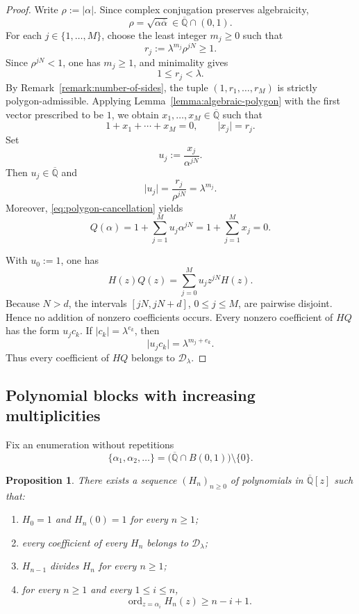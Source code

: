 \documentclass[10pt,a4paper]{amsart}
\newtheorem{proposition}[theorem]{Proposition}
\numberwithin{equation}{section}
\newcommand{\Qbar}{\overline{\mathbb Q}}
\newcommand{\D}{\mathcal D}
\newcommand{\abs}[1]{\lvert #1\rvert}
\newcommand{\ord}{\operatorname{ord}}
\newcommand{\B}{B(0,1)}
\begin{document}
\begin{proof}
Write $\rho:=\abs\alpha$. Since complex conjugation preserves algebraicity,
\[
        \rho=\sqrt{\alpha\overline\alpha}\in\Qbar\cap(0,1).
\]
For each $j\in\{1,\ldots,M\}$, choose the least integer $m_j\geq0$ such that
\[
        r_j:=\lambda^{m_j}\rho^{jN}\geq1.
\]
Since $\rho^{jN}<1$, one has $m_j\geq1$, and minimality gives
\begin{equation}\label{eq:normalized-lengths}
        1\leq r_j<\lambda.
\end{equation}
By Remark~\ref{remark:number-of-sides}, the tuple
$(1,r_1,\ldots,r_M)$ is strictly polygon-admissible. Applying
Lemma~\ref{lemma:algebraic-polygon} with the first vector prescribed to be
$1$, we obtain $x_1,\ldots,x_M\in\Qbar$ such that
\begin{equation}\label{eq:polygon-cancellation}
        1+x_1+\cdots+x_M=0,
        \qquad
        \abs{x_j}=r_j.
\end{equation}
Set
\[
        u_j:=\frac{x_j}{\alpha^{jN}}.
\]
Then $u_j\in\Qbar$ and
\[
        \abs{u_j}=\frac{r_j}{\rho^{jN}}=\lambda^{m_j}.
\]
Moreover, \eqref{eq:polygon-cancellation} yields
\[
        Q(\alpha)
        =1+\sum_{j=1}^{M}u_j\alpha^{jN}
        =1+\sum_{j=1}^{M}x_j
        =0.
\]

With $u_0:=1$, one has
\[
        H(z)Q(z)=\sum_{j=0}^{M}u_jz^{jN}H(z).
\]
Because $N>d$, the intervals $[jN,jN+d]$, $0\leq j\leq M$, are pairwise
disjoint. Hence no addition of nonzero coefficients occurs. Every nonzero
coefficient of $HQ$ has the form $u_jc_k$. If
$\abs{c_k}=\lambda^{e_k}$, then
\[
        \abs{u_jc_k}=\lambda^{m_j+e_k}.
\]
Thus every coefficient of $HQ$ belongs to $\D_\lambda$.
\end{proof}

\subsection{Polynomial blocks with increasing multiplicities}

Fix an enumeration without repetitions
\begin{equation}\label{eq:enumeration}
        \{\alpha_1,\alpha_2,\ldots\}
        =\bigl(\Qbar\cap\B\bigr)\setminus\{0\}.
\end{equation}

\begin{proposition}\label{proposition:blocks}
There exists a sequence $(H_n)_{n\geq0}$ of polynomials in $\Qbar[z]$ such
that:
\begin{enumerate}[label=\textup{(\roman*)}]
\item $H_0=1$ and $H_n(0)=1$ for every $n\geq1$;
\item every coefficient of every $H_n$ belongs to $\D_\lambda$;
\item $H_{n-1}$ divides $H_n$ for every $n\geq1$;
\item for every $n\geq1$ and every $1\leq i\leq n$,
\begin{equation}\label{eq:multiplicity}
        \ord_{z=\alpha_i}H_n(z)\geq n-i+1.
\end{equation}
\end{enumerate}
\end{proposition}
\end{document}
